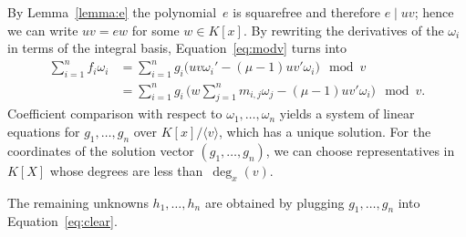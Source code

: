 \documentclass{sig-alternate}
\def\<#1>{\langle#1\rangle}
\begin{document}
By Lemma~\ref{lemma:e} the polynomial~$e$ is squarefree and therefore $e\mid uv$;
hence we can write $uv=ew$ for some $w\in K[x]$. By rewriting the
derivatives of the $\omega_i$ in terms of the integral basis,
Equation~\eqref{eq:modv} turns into
\begin{align*}
  \sum_{i=1}^n f_i\omega_i
  &= \sum_{i=1}^n g_i \bigl( uv\omega_i' - (\mu-1)uv'\omega_i \bigr) \mod v\\
  &= \sum_{i=1}^n g_i\, \biggl( w\sum_{j=1}^n m_{i,j}\omega_j - (\mu-1)uv'\omega_i \biggr) \mod v.
\end{align*}
Coefficient comparison with respect to $\omega_1,\ldots,\omega_n$ yields a
system of linear equations for $g_1,\ldots,g_n$ over $K[x]/\<v>$, which has
a unique solution. For the coordinates of the solution vector $(g_1,\dots,g_n)$,
we can choose representatives in $K[X]$ whose degrees are less than~$\deg_x(v)$.

The remaining unknowns $h_1,\ldots,h_n$ are obtained by plugging
$g_1,\ldots,g_n$ into Equation~\eqref{eq:clear}.
\end{document}
